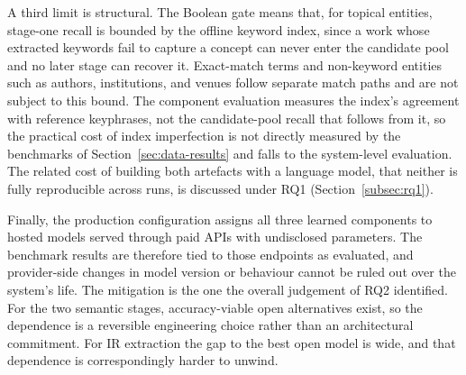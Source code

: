 A third limit is structural. The Boolean gate means that, for topical entities, stage-one recall is bounded by the offline keyword index, since a work whose extracted keywords fail to capture a concept can never enter the candidate pool and no later stage can recover it. Exact-match terms and non-keyword entities such as authors, institutions, and venues follow separate match paths and are not subject to this bound. The component evaluation measures the index's agreement with reference keyphrases, not the candidate-pool recall that follows from it, so the practical cost of index imperfection is not directly measured by the benchmarks of Section~\ref{sec:data-results} and falls to the system-level evaluation. The related cost of building both artefacts with a language model, that neither is fully reproducible across runs, is discussed under RQ1 (Section~\ref{subsec:rq1}).

Finally, the production configuration assigns all three learned components to hosted models served through paid APIs with undisclosed parameters. The benchmark results are therefore tied to those endpoints as evaluated, and provider-side changes in model version or behaviour cannot be ruled out over the system's life. The mitigation is the one the overall judgement of RQ2 identified. For the two semantic stages, accuracy-viable open alternatives exist, so the dependence is a reversible engineering choice rather than an architectural commitment. For IR extraction the gap to the best open model is wide, and that dependence is correspondingly harder to unwind.